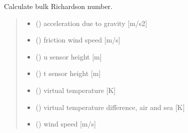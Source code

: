 \documentclass[letterpaper,10pt,english]{sphinxmanual}
\begin{document}
\begin{fulllineitems}
\label{\detokenize{users_guide:AirSeaFluxCode.flux_subs.get_Rb}}
\pysigstartsignatures
\pysiglinewithargsret
{}
{\sphinxparamcomma {}\sphinxparamcomma {}\sphinxparamcomma {}\sphinxparamcomma {}\sphinxparamcomma {}\sphinxparamcomma {}\sphinxparamcomma {}\sphinxparamcomma {}}
{}
\pysigstopsignatures
\sphinxAtStartPar
Calculate bulk Richardson number.
\begin{quote}\begin{description}
\begin{itemize}
\item {}
\sphinxAtStartPar
{} () \textendash{} acceleration due to gravity {[}m/s2{]}

\item {}
\sphinxAtStartPar
{} () \textendash{} friction wind speed {[}m/s{]}

\item {}
\sphinxAtStartPar
{} () \textendash{} u sensor height {[}m{]}

\item {}
\sphinxAtStartPar
{} () \textendash{} t sensor height {[}m{]}

\item {}
\sphinxAtStartPar
{} () \textendash{} virtual temperature {[}K{]}

\item {}
\sphinxAtStartPar
{} () \textendash{} virtual temperature difference, air and sea {[}K{]}

\item {}
\sphinxAtStartPar
{} () \textendash{} wind speed {[}m/s{]}


\end{itemize}
\end{description}
\end{quote}
\end{fulllineitems}
\end{document}
